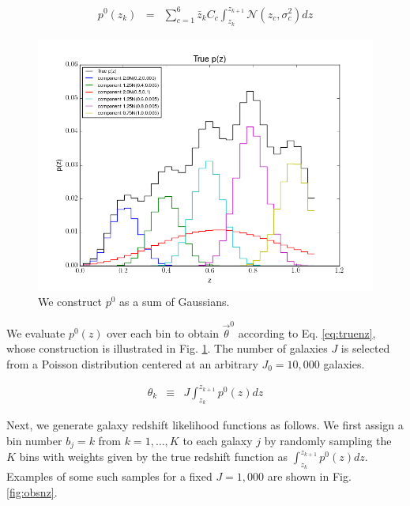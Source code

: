 \documentclass[12pt, onecolumn]{emulateapj}
\begin{document}
\begin{eqnarray}
\label{eq:truepz}
p^{0}(z_{k}) &=& \sum_{c=1}^{6}\bar{z}_{k}C_{c}\int_{z_{k}}^{z_{k+1}} \mathcal{N}(z_{c},\sigma^{2}_{c})dz
\end{eqnarray}

\begin{figure}
\label{fig:truepz}
\includegraphics[scale=0.5]{truePz.png}
\caption{We construct $p^{0}$ as a sum of Gaussians.}
\end{figure}

We evaluate $p^{0}(z)$ over each bin to obtain $\vec{\theta}^{0}$ according to Eq. \ref{eq:truenz}, whose construction is illustrated in Fig. \ref{fig:truepz}.  The number of galaxies $J$ is selected from a Poisson distribution centered at an arbitrary $J_{0}=10,000$ galaxies.

\begin{eqnarray}
\label{eq:truenz}
\theta_{k} &\equiv& J\int_{z_{k}}^{z_{k+1}}p^{0}(z) dz
\end{eqnarray}

Next, we generate galaxy redshift likelihood functions as follows.  We first assign a bin number $b_{j}=k$ from $k=1,\dots,K$ to each galaxy $j$ by randomly sampling the $K$ bins with weights given by the true redshift function as $\int_{z_{k}}^{z_{k+1}}p^{0}(z)dz$.  Examples of some such samples for a fixed $J=1,000$ are shown in Fig. \ref{fig:obsnz}.
\end{document}
